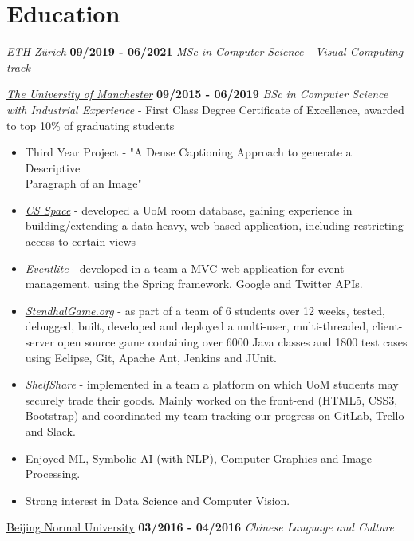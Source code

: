 \documentclass[]{friggeri-cv}
\begin{document}
\section{\color{red}Education}
\begin{entrylist}
    \entry
    {}
    {\emph{\href{https://inf.ethz.ch/studies/master/master-cs.html}{ETH Zürich}}}
    {\textbf{09/2019 - 06/2021}}
    {\emph{MSc in Computer Science - Visual Computing track}}

  \entry
    {}
    {\emph{\href{http://www.manchester.ac.uk/}{The University of Manchester}}}
    {\textbf{09/2015 - 06/2019}}
    {\emph{BSc in Computer Science with Industrial Experience} - First Class Degree}
    {Certificate of Excellence, awarded to top 10\% of graduating students}
    \begin{itemize}
        \item Third Year Project - "A Dense Captioning Approach to generate a Descriptive \\Paragraph of an Image"
        \item \emph{\href{https://rooms.cs.manchester.ac.uk}{CS Space}} - developed a UoM room database, gaining experience in building/extending a data-heavy, web-based application, including restricting access to certain views
        \item \emph{Eventlite} - developed in a team a MVC web application for event management, using the Spring framework, Google and Twitter APIs.
        \item \emph{\href{https://stendhalgame.org/}{StendhalGame.org}} - as part of a team of 6 students over 12 weeks, tested, debugged, built, developed and deployed a multi-user, multi-threaded, client-server open source game containing over 6000 Java classes and 1800 test cases using Eclipse, Git, Apache Ant, Jenkins and JUnit.
        \item \emph{ShelfShare} - implemented in a team a platform on which UoM students may securely trade their goods. Mainly worked on the front-end (HTML5, CSS3, Bootstrap) and coordinated my team tracking our progress on GitLab, Trello and Slack.
        \item Enjoyed ML, Symbolic AI (with NLP), Computer Graphics and Image Processing.
        \item Strong interest in Data Science and Computer Vision.
    \end{itemize}
  \entry
    {}
    {\href{http://english.bnu.edu.cn/}{Beijing Normal University}}
    {\textbf{03/2016 - 04/2016}}
    {\emph{Chinese Language and Culture}}

\end{entrylist}
\end{document}
